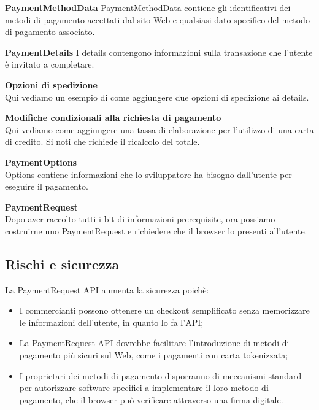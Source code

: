 \documentclass[11pt ,a4paper , twoside , openright ]{article}
\begin{document}
\pagebreak
\textbf{PaymentMethodData}
PaymentMethodData contiene gli identificativi dei metodi di pagamento accettati dal sito Web e qualsiasi dato specifico del metodo di pagamento associato.

\textbf{PaymentDetails}
I details contengono informazioni sulla transazione che l'utente è invitato a completare.

\pagebreak
\textbf{Opzioni di spedizione}
\\
Qui vediamo un esempio di come aggiungere due opzioni di spedizione ai details.


\flushleft\textbf{Modifiche condizionali alla richiesta di pagamento}
\\
Qui vediamo come aggiungere una tassa di elaborazione per l'utilizzo di una carta di credito. Si noti che richiede il ricalcolo del totale.

\pagebreak
\textbf{PaymentOptions} \\
Options contiene informazioni che lo sviluppatore ha bisogno dall'utente per eseguire il pagamento.


\textbf{PaymentRequest} \\
Dopo aver raccolto tutti i bit di informazioni prerequisite, ora possiamo costruirne uno PaymentRequest e richiedere che il browser lo presenti all'utente.


\subsection{Rischi e sicurezza}
La PaymentRequest API aumenta la sicurezza poichè:
\begin{itemize}
	\item I commercianti possono ottenere un checkout semplificato senza memorizzare le informazioni dell'utente, in quanto lo fa l'API;
	\item La PaymentRequest API dovrebbe facilitare l'introduzione di metodi di pagamento più sicuri sul Web, come i pagamenti con carta tokenizzata;
	\item I proprietari dei metodi di pagamento disporranno di meccanismi standard per autorizzare software specifici a implementare il loro metodo di pagamento, che il browser può verificare attraverso una firma digitale.
\end{itemize}
\end{document}
